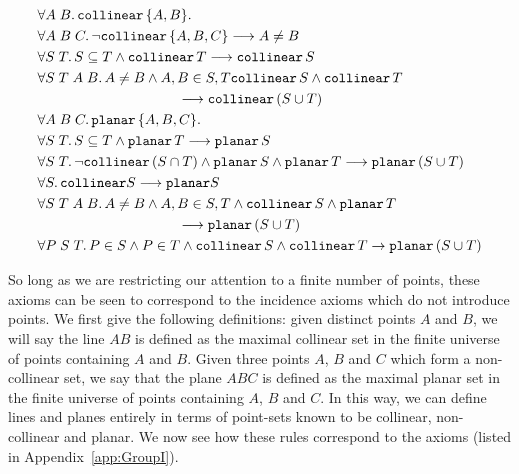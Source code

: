 \label{rules}
\begin{align}
&\forall A\;B.\, \texttt{collinear}\, \{A,B\}. \label{rule:colltwo}\\
&\forall A\;B\;C.\, \neg \texttt{collinear}\, \{A,B,C\} \longrightarrow A \neq B
  \label{rule:noncollneq}\\
&\forall S\;T.\, S \subseteq T \wedge \texttt{collinear}\, T \longrightarrow \texttt{collinear}\, S
  \label{rule:collsubset}\\
&\forall S\;T\;A\;B.\, A \neq B \wedge A,B \in S,T \texttt{collinear}\, S \wedge \texttt{collinear}\, T\notag\\&\qquad\qquad\qquad\qquad\qquad \longrightarrow \texttt{collinear}\, (S \cup T) \label{rule:collunion}\\
&\forall A\;B\;C.\, \texttt{planar}\, \{A,B,C\}. \label{rule:planethree}\\
&\forall S\;T.\, S \subseteq T \wedge \texttt{planar}\, T \longrightarrow \texttt{planar}\, S
  \label{rule:planesubset}\\
&\forall S\;T.\, \neg\texttt{collinear}\, (S \cap T) \wedge \texttt{planar}\, S \wedge \texttt{planar}\, T \longrightarrow \texttt{planar}\, (S \cup T) \label{rule:planeunion}\\
&\forall S.\, \texttt{collinear} S \longrightarrow \texttt{planar} S \label{rule:collplane}\\
&\forall S\;T\;A\;B.\, A \neq B \wedge A,B \in S,T \wedge \texttt{collinear}\, S \wedge \texttt{planar}\, T\notag\\&\qquad\qquad\qquad\qquad\qquad \longrightarrow \texttt{planar}\, (S \cup T) \label{rule:collplaneplane}\\
&\forall P\;S\;T.\, P \in S \wedge P \in T \wedge \texttt{collinear}\, S \wedge \texttt{collinear}\, T \rightarrow \texttt{planar}\, (S \cup T) \label{rule:collcollplane}
\end{align}

So long as we are restricting our attention to a finite number of points, these axioms can be seen to correspond to the incidence axioms which do not introduce points. We first give the following definitions: given distinct points $A$ and $B$, we will say the line $AB$ is defined as the maximal collinear set in the finite universe of points containing $A$ and $B$. Given three points $A$, $B$ and $C$ which form a non-collinear set, we say that the plane $ABC$ is defined as the maximal planar set in the finite universe of points containing $A$, $B$ and $C$. In this way, we can define lines and planes entirely in terms of point-sets known to be collinear, non-collinear and planar. We now see how these rules correspond to the axioms (listed in Appendix~\ref{app:GroupI}).

